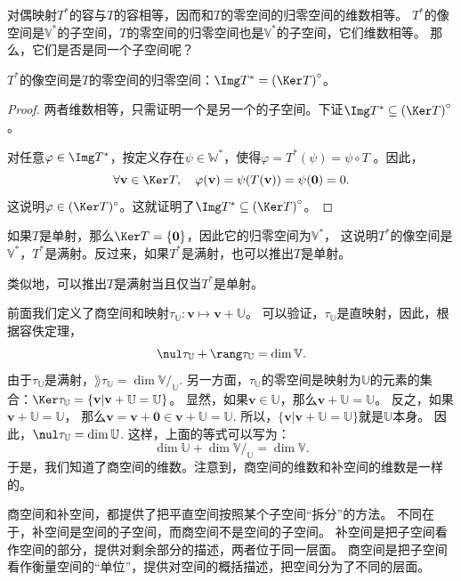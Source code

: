 \documentclass[12pt,UTF8]{ctexbook}
\begin{document}
对偶映射$T^*$的容与$T$的容相等，因而和$T$的零空间的归零空间的维数相等。
$T^*$的像空间是$\mathbb{V}^*$的子空间，$T$的零空间的归零空间也是$\mathbb{V}^*$的子空间，它们维数相等。
那么，它们是否是同一个子空间呢？
\begin{pp}\label{pp:3_10}
    $T^*$的像空间是$T$的零空间的归零空间：$\Img T^* = \left(\Ker T\right)^\circ$。
\end{pp}
\begin{proof} %
两者维数相等，只需证明一个是另一个的子空间。下证$\Img T^* \subseteq \left(\Ker T\right)^\circ$。

对任意$\varphi \in \Img T^*$，按定义存在$\psi \in \mathbb{W}^*$，使得$\varphi = T^*(\psi) = \psi\circ T$ 。因此，
$$\forall \mathbf{v} \in \Ker T , \quad \varphi (\mathbf{v}) = \psi(T(\mathbf{v})) = \psi(\mathbf{0}) = 0.$$
这说明$\varphi \in (\Ker T)^\circ$。这就证明了$\Img T^* \subseteq \left(\Ker T\right)^\circ$。
\end{proof}

如果$T$是单射，那么$\Ker T = \{\mathbf{0}\}$，因此它的归零空间为$\mathbb{V}^*$，
这说明$T^*$的像空间是$\mathbb{V}^*$，$T^*$是满射。反过来，如果$T^*$是满射，也可以推出$T$是单射。

类似地，可以推出$T$是满射当且仅当$T^*$是单射。

前面我们定义了商空间和映射$\tau_\mathbb{U}: \mathbf{v} \mapsto \mathbf{v} + \mathbb{U}$。
可以验证，$\tau_\mathbb{U}$是直映射，因此，根据容佚定理，
$$\nul \tau_\mathbb{U} + \rang \tau_\mathbb{U} = \dim \mathbb{V}.$$
由于$\tau_\mathbb{U}$是满射，$\rang \tau_\mathbb{U} = \dim \mathbb{V}/_\mathbb{U}.$ 
另一方面，$\tau_\mathbb{U}$的零空间是映射为$\mathbb{U}$的元素的集合：$\Ker \tau_\mathbb{U} = \{\mathbf{v} | \mathbf{v} + \mathbb{U} = \mathbb{U}\} $。
显然，如果$\mathbf{v} \in \mathbb{U}$，那么$\mathbf{v} + \mathbb{U} = \mathbb{U}$。
反之，如果$\mathbf{v} + \mathbb{U} = \mathbb{U}$，
那么$\mathbf{v} = \mathbf{v} + \mathbf{0}  \in \mathbf{v} + \mathbb{U} =\mathbb{U}$. 
所以，$\{\mathbf{v} | \mathbf{v} + \mathbb{U} = \mathbb{U}\} $就是$\mathbb{U}$本身。
因此，$\nul \tau_\mathbb{U} = \dim \mathbb{U}$. 这样，上面的等式可以写为：
$$\dim \mathbb{U} + \dim \mathbb{V}/_\mathbb{U} = \dim \mathbb{V}.$$
于是，我们知道了商空间的维数。注意到，商空间的维数和补空间的维数是一样的。

商空间和补空间，都提供了把平直空间按照某个子空间“拆分”的方法。
不同在于，补空间是空间的子空间，而商空间不是空间的子空间。
补空间是把子空间看作空间的部分，提供对剩余部分的描述，两者位于同一层面。
商空间是把子空间看作衡量空间的“单位”，提供对空间的概括描述，把空间分为了不同的层面。
\end{document}
